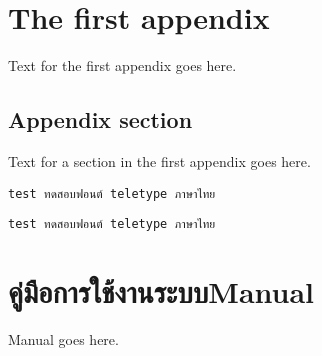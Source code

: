 \chapter{The first appendix}

Text for the first appendix goes here.

\section{Appendix section}

Text for a section in the first appendix goes here.

\verb+test ทดสอบฟอนต์ teletype ภาษาไทย+

\texttt{test ทดสอบฟอนต์ teletype ภาษาไทย}

\chapter{\ifcpe คู่มือการใช้งานระบบ\else Manual\fi}

Manual goes here.
